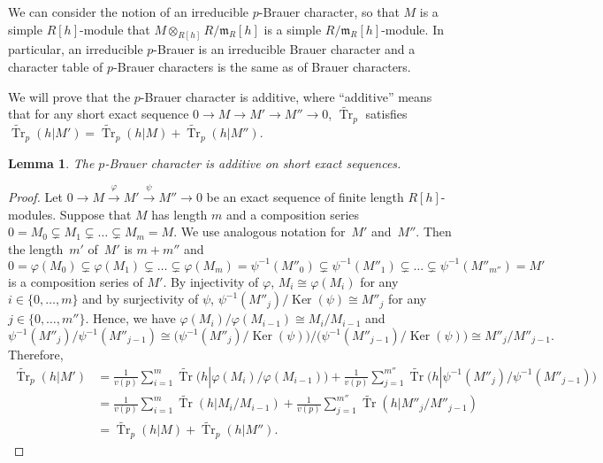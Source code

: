 \documentclass[11pt]{article}
\numberwithin{equation}{section}
\numberwithin{equation}{section}
\newtheorem{Lemma}[Theorem]{Lemma}
\begin{document}
We can consider the notion of an irreducible $p$-Brauer character, so that $M$ is a simple $R[h]$-module that $M\otimes_{R[h]} R/\mathfrak{m}_R[h]$ is a simple $R/\mathfrak{m}_R[h]$-module. In particular, an irreducible $p$-Brauer is an irreducible Brauer character and a character table of $p$-Brauer characters is the same as of Brauer characters.

We will prove that the $p$-Brauer character is additive, where ``additive'' means that for any short exact sequence $0\rightarrow M\rightarrow M'\rightarrow M''\rightarrow 0$, $\widetilde{\operatorname{Tr}}_p$ satisfies $\widetilde{\operatorname{Tr}}_p(h|M')=\widetilde{\operatorname{Tr}}_p(h|M)+\widetilde{\operatorname{Tr}}_p(h|M'')$.

\begin{Lemma}\label{additive}
The $p$-Brauer character is additive on short exact sequences.
\end{Lemma}

\begin{proof}
Let $0\rightarrow M\xrightarrow{\varphi} M'\xrightarrow{\psi} M''\rightarrow 0$ be an exact sequence of finite length $R[h]$-modules. Suppose that $M$ has length $m$ and a composition series $0=M_0\subsetneq M_1\subsetneq \dots \subsetneq M_m=M$. We use analogous notation for~$M'$ and~$M''$. Then the length~$m'$ of~$M'$ is $m+m''$ and
\[
0=\varphi(M_0)\subsetneq \varphi(M_1)\subsetneq \dots \subsetneq \varphi(M_m)=\psi^{-1}(M''_0)\subsetneq \psi^{-1}(M''_1)\subsetneq \dots \subsetneq \psi^{-1}(M''_{m''})=M'
\]
 is a composition series of $M'$. By injectivity of $\varphi$, $M_i\cong \varphi(M_i)$ for any $i \in \{0, \dots,m\}$ and by surjectivity of $\psi$, $\psi^{-1}(M''_j)/\operatorname{Ker}(\psi)\cong M''_j$ for any $j \in \{0, \dots,m''\}$. Hence, we have $\varphi(M_i)/\varphi(M_{i-1})\cong M_i/M_{i-1}$ and
\[
\psi^{-1}(M''_j)/\psi^{-1}(M''_{j-1})\cong \big(\psi^{-1}(M''_j)/\operatorname{Ker}(\psi)\big)/\big(\psi^{-1}(M''_{j-1})/\operatorname{Ker}(\psi)\big) \cong M''_j/M''_{j-1}.
\]
 Therefore,
\begin{align*}
\widetilde{\operatorname{Tr}}_p(h|M')&=\frac{1}{v(p)}\sum_{i=1}^m\widetilde{\operatorname{Tr}}\big(h|\varphi(M_i)/\varphi(M_{i-1})\big) +\frac{1}{v(p)}\sum_{j=1}^{m''}\widetilde{\operatorname{Tr}}\big(h|\psi^{-1}(M''_j)/\psi^{-1}(M''_{j-1})\big) \\
 &=\frac{1}{v(p)}\sum_{i=1}^m\widetilde{\operatorname{Tr}}(h|M_i/M_{i-1})+\frac{1}{v(p)}\sum_{j=1}^{m''}\widetilde{\operatorname{Tr}}(h|M''_j/M''_{j-1}) \\
 &=\widetilde{\operatorname{Tr}}_p(h|M)+\widetilde{\operatorname{Tr}}_p(h|M'').\tag*{\qed}
\end{align*}\renewcommand{\qed}{}
\end{proof}
\end{document}

